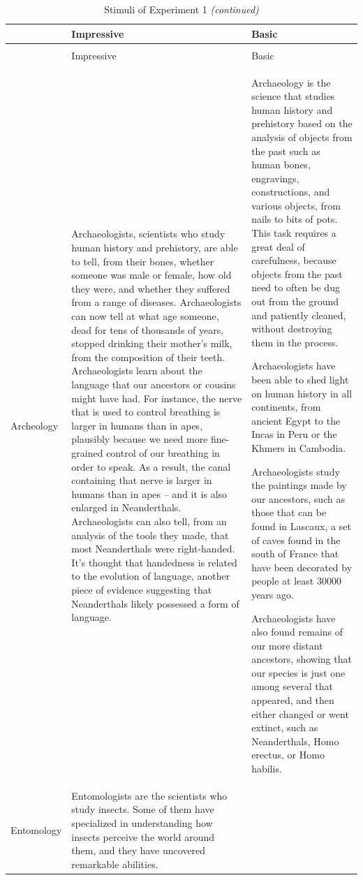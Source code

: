 \documentclass[
  english,
  doc,floatsintext]{apa6}
\begin{document}
\begin{longtable}[t]{>{\raggedright\arraybackslash}p{5em}>{\raggedright\arraybackslash}p{25em}>{\raggedright\arraybackslash}p{25em}}
\caption{\label{tab:exp1-stimuli}Stimuli of Experiment 1}\\
\toprule
 & Impressive & Basic\\
\midrule
\endfirsthead
\caption[]{\label{tab:exp1-stimuli}Stimuli of Experiment 1 \textit{(continued)}}\\
\toprule
 & Impressive & Basic\\
\midrule
\endhead

\endfoot
\bottomrule
\endlastfoot
Archeology & Archaeologists, scientists who study human history and prehistory, are able to tell, from their bones, whether someone was male or female, how old they were, and whether they suffered from a range of diseases. Archaeologists can now tell at what age someone, dead for tens of thousands of years, stopped drinking their mother’s milk, from the composition of their teeth.
Archaeologists learn about the language that our ancestors or cousins might have had. For instance, the nerve that is used to control breathing is larger in humans than in apes, plausibly because we need more fine-grained control of our breathing in order to speak. As a result, the canal containing that nerve is larger in humans than in apes – and it is also enlarged in Neanderthals.
Archaeologists can also tell, from an analysis of the tools they made, that most Neanderthals were right-handed. It’s thought that handedness is related to the evolution of language, another piece of evidence suggesting that Neanderthals likely possessed a form of language. & Archaeology is the science that studies human history and prehistory based on the analysis of objects from the past such as human bones, engravings, constructions, and various objects, from nails to bits of pots. This task requires a great deal of carefulness, because objects from the past need to often be dug out from the ground and patiently cleaned, without destroying them in the process.

Archaeologists have been able to shed light on human history in all continents, from ancient Egypt to the Incas in Peru or the Khmers in Cambodia.

Archaeologists study the paintings made by our ancestors, such as those that can be found in Lascaux, a set of caves found in the south of France that have been decorated by people at least 30000 years ago.

Archaeologists have also found remains of our more distant ancestors, showing that our species is just one among several that appeared, and then either changed or went extinct, such as Neanderthals, Homo erectus, or Homo habilis.\\
Entomology & Entomologists are the scientists who study insects. Some of them have specialized in understanding how insects perceive the world around them, and they have uncovered remarkable abilities. 


\end{longtable}
\end{document}
